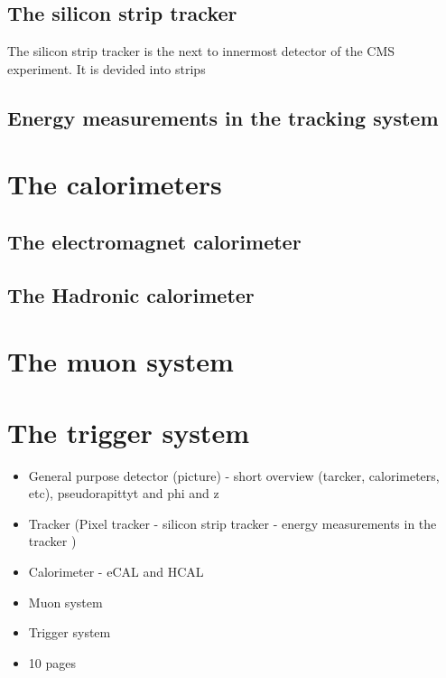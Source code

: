\subsection*{The silicon strip tracker}
The silicon strip tracker is the next to innermost detector of the CMS experiment.
It is devided into strips

\subsection*{Energy measurements in the tracking system}

\section{The calorimeters}
\subsection*{The electromagnet calorimeter}
\subsection*{The Hadronic calorimeter}

\section{The muon system}

\section{The trigger system}

\begin{itemize}
\item General purpose detector (picture) - short overview (tarcker, calorimeters, etc), pseudorapittyt and phi and z
\item Tracker (Pixel tracker - silicon strip tracker - energy measurements in the tracker )
\item Calorimeter - eCAL and HCAL
\item Muon system
\item Trigger system
\item 10 pages
\end{itemize}

\FloatBarrier
